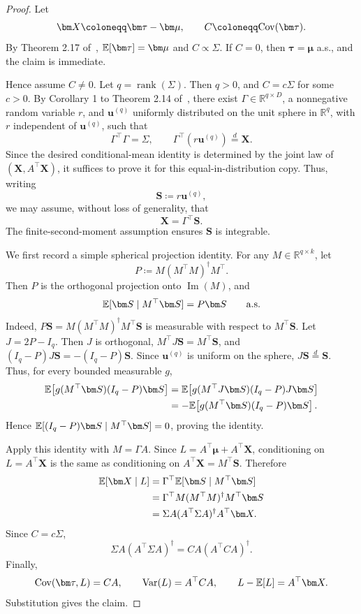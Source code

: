 \begin{proof}
  Let
  \[
    \bm X\coloneqq \bm\tau-\bm\mu,
    \qquad
    C\coloneqq \cov(\bm\tau).
  \]
  By Theorem 2.17 of~\cite{FangKo90}, \(\E[\bm\tau]=\bm\mu\) and \(C\propto\Sigma\).
  If \(C=0\), then
  \(\bm\tau=\bm\mu\) a.s., and the claim is immediate.

  Hence assume \(C\neq 0\).
  Let \(q=\operatorname{rank}(\Sigma)\).
  Then \(q>0\), and \(C=c\Sigma\) for some \(c>0\).
  By Corollary 1 to Theorem 2.14 of~\cite{FangKo90}, there exist
  \(\Gamma\in\mathbb R^{q\times D}\), a nonnegative random variable \(r\),
  and \(\bm u^{(q)}\) uniformly distributed on the unit sphere in
  \(\mathbb R^q\), with \(r\) independent of \(\bm u^{(q)}\), such that
  \[
    \Gamma^\top\Gamma=\Sigma,
    \qquad
    \Gamma^\top(r\bm u^{(q)})\stackrel d=\bm X .
  \]
  Since the desired conditional-mean identity is determined by the joint
  law of \((\bm X,A^\top\bm X)\), it suffices to prove it for this equal-in-distribution copy.
  Thus, writing
  \[
    \bm S\coloneqq r\bm u^{(q)},
  \]
  we may assume, without loss of generality, that
  \[
    \bm X=\Gamma^\top\bm S.
  \]
  The finite-second-moment assumption ensures \(\bm S\) is integrable.

  We first record a simple spherical projection identity.
  For any \(M\in\mathbb R^{q\times k}\), let
  \[
    P\coloneqq M(M^\top M)^\dagger M^\top .
  \]
  Then \(P\) is the orthogonal projection onto \(\operatorname{Im}(M)\), and
  \[
    \E[\bm S\mid M^\top\bm S]=P\bm S
    \qquad\text{a.s.}
  \]
  Indeed, \(P\bm S=M(M^\top M)^\dagger M^\top\bm S\) is measurable with respect to \(M^\top\bm S\).
  Let \(J=2P-I_q\).
  Then \(J\) is orthogonal,
  \(M^\top J\bm S=M^\top\bm S\), and
  \((I_q-P)J\bm S=-(I_q-P)\bm S\).
  Since \(\bm u^{(q)}\) is uniform on the sphere, \(J\bm S\stackrel d=\bm S\).
  Thus, for every bounded measurable
  \(g\),
  \[
    \begin{aligned}
      \E\!\left[g(M^\top\bm S)(I_q-P)\bm S\right]
      &=
      \E\!\left[g(M^\top J\bm S)(I_q-P)J\bm S\right] \\
      &=
      -\E\!\left[g(M^\top\bm S)(I_q-P)\bm S\right].
    \end{aligned}
  \]
  Hence \(\E[(I_q-P)\bm S\mid M^\top\bm S]=0\), proving the identity.

  Apply this identity with \(M=\Gamma A\).
  Since
  \(L=A^\top\bm\mu+A^\top\bm X\), conditioning on \(L=A^\top\bm X\) is the same as
  conditioning on \(A^\top\bm X=M^\top\bm S\).
  Therefore
  \[
    \begin{aligned}
      \E[\bm X\mid L]
      &=
      \Gamma^\top\E[\bm S\mid M^\top\bm S] \\
      &=
      \Gamma^\top M(M^\top M)^\dagger M^\top\bm S \\
      &=
      \Sigma A(A^\top\Sigma A)^\dagger A^\top\bm X .
    \end{aligned}
  \]
  Since \(C=c\Sigma\),
  \[
    \Sigma A(A^\top\Sigma A)^\dagger
    =
    C A(A^\top C A)^\dagger .
  \]
  Finally,
  \[
    \cov(\bm\tau,L)=CA,
    \qquad
    \var(L)=A^\top C A,
    \qquad
    L-\E[L]=A^\top\bm X.
  \]
  Substitution gives the claim.
\end{proof}


